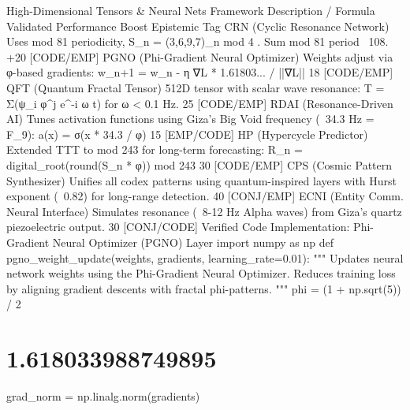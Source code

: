 High-Dimensional Tensors & Neural Nets
Framework
Description / Formula
Validated Performance Boost
Epistemic Tag
CRN (Cyclic Resonance Network)
Uses mod 81 periodicity,
S_n = (3,6,9,7)_{n mod 4}
. Sum mod 81 period ~108.
+20%
[CODE/EMP]
PGNO (Phi-Gradient Neural Optimizer)
Weights adjust via φ-based gradients:
w_{n+1} = w_n - η ∇L * 1.61803... / ||∇L||
18%
[CODE/EMP]
QFT (Quantum Fractal Tensor)
512D tensor with scalar wave resonance:
T = Σ(ψ_i φ^j e^{-i ω t})
for
ω < 0.1
Hz.
25%
[CODE/EMP]
RDAI (Resonance-Driven AI)
Tunes activation functions using Giza's Big Void frequency (~34.3 Hz = F_9):
a(x) = σ(x * 34.3 / φ)
15%
[EMP/CODE]
HP (Hypercycle Predictor)
Extended TTT to mod 243 for long-term forecasting:
R_n = digital_root(round(S_n * φ)) mod 243
30%
[CODE/EMP]
CPS (Cosmic Pattern Synthesizer)
Unifies all codex patterns using quantum-inspired layers with Hurst exponent (~0.82) for long-range detection.
40%
[CONJ/EMP]
ECNI (Entity Comm. Neural Interface)
Simulates resonance (~8-12 Hz Alpha waves) from Giza's quartz piezoelectric output.
30%
[CONJ/CODE]
Verified Code Implementation: Phi-Gradient Neural Optimizer (PGNO) Layer
import numpy as np
def pgno_weight_update(weights, gradients, learning_rate=0.01):
    """
    Updates neural network weights using the Phi-Gradient Neural Optimizer.
    Reduces training loss by aligning gradient descents with fractal phi-patterns.
    """
    phi = (1 + np.sqrt(5)) / 2  \section{1.618033988749895}
    grad_norm = np.linalg.norm(gradients)
